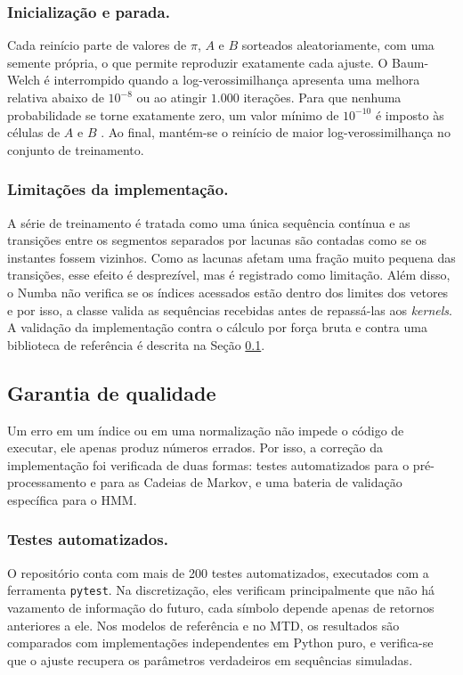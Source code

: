 \documentclass[
    12pt,                %
    openright,           %
    oneside,             %
    a4paper,             %
    english,             %
    brazil               %
]{abntex2}
\begin{document}
\subsubsection{Inicialização e parada.} Cada reinício parte de valores de $\pi$, $A$ e $B$ sorteados aleatoriamente, com uma semente 
própria, o que permite reproduzir exatamente cada ajuste. O Baum-Welch é interrompido quando a log-verossimilhança apresenta uma 
melhora relativa abaixo de $10^{-8}$ ou ao atingir $1.000$ iterações. Para que nenhuma probabilidade se torne exatamente zero, um valor mínimo 
de $10^{-10}$ é imposto às células de $A$ e $B$ \cite{Rabiner1989}.  Ao final, mantém-se o reinício de maior 
log-verossimilhança no conjunto de treinamento.

\subsubsection{Limitações da implementação.} A série de treinamento é tratada como uma única sequência contínua e as 
transições entre os segmentos separados por lacunas são contadas como se os instantes fossem vizinhos. Como as 
lacunas afetam uma fração muito pequena das transições, esse efeito é desprezível, mas é registrado como limitação. 
Além disso, o Numba não verifica se os índices acessados estão dentro dos limites dos vetores e por isso, a 
classe valida as sequências recebidas antes de repassá-las aos \textit{kernels}. A validação da implementação contra o 
cálculo por força bruta e contra uma biblioteca de referência é descrita na Seção \ref{sec:garantia_qualidade}.

\subsection{Garantia de qualidade}
\label{sec:garantia_qualidade}

Um erro em um índice ou em uma normalização não impede o código de executar, ele apenas produz números errados. Por isso, a correção da implementação 
foi verificada de duas formas: testes automatizados para o pré-processamento e para as Cadeias de Markov, e uma bateria de validação específica para o HMM.

\subsubsection{Testes automatizados.} O repositório conta com mais de 200 testes automatizados, executados com a ferramenta \texttt{pytest}.
Na discretização, eles verificam principalmente que não há vazamento de informação do futuro, cada símbolo depende apenas de retornos anteriores a ele. 
Nos modelos de referência e no MTD, os resultados são comparados com implementações independentes em Python puro, e verifica-se que o ajuste 
recupera os parâmetros verdadeiros em sequências simuladas.
\end{document}
